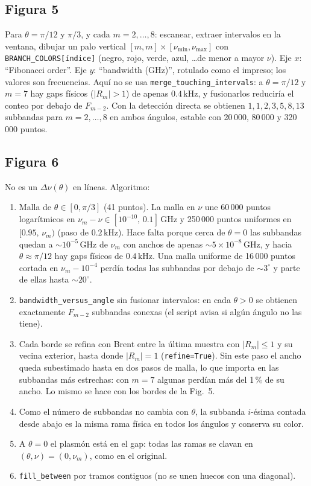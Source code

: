 \documentclass[11pt,a4paper]{article}
\begin{document}
\subsection{Figura 5}

Para \(\theta=\pi/12\) y \(\pi/3\), y cada \(m=2,\ldots,8\):
escanear, extraer intervalos en la ventana, dibujar un palo vertical
\([m,m]\times[\nu_{\min},\nu_{\max}]\) con
\texttt{BRANCH\_COLORS[índice]} (negro, rojo, verde, azul, \ldots de menor a
mayor \(\nu\)).
Eje \(x\): ``Fibonacci order''. Eje \(y\): ``bandwidth (GHz)'', rotulado como
el impreso; los valores son frecuencias.
Aquí no se usa \texttt{merge\_touching\_intervals}: a \(\theta=\pi/12\) y
\(m=7\) hay gaps físicos (\(|R_m|>1\)) de apenas \(0.4\,\mathrm{kHz}\), y
fusionarlos reduciría el conteo por debajo de \(F_{m-2}\).
Con la detección directa se obtienen \(1,1,2,3,5,8,13\) subbandas para
\(m=2,\ldots,8\) en ambos ángulos, estable con 20\,000, 80\,000 y 320\,000
puntos.

\subsection{Figura 6}

No es un \(\Delta\nu(\theta)\) en líneas. Algoritmo:

\begin{enumerate}
\item Malla de \(\theta\in[0,\pi/3]\) (41 puntos). La malla en \(\nu\) une
60\,000 puntos logarítmicos en \(\nu_m-\nu\in[10^{-10},\,0.1]\,\mathrm{GHz}\)
y 250\,000 puntos uniformes en \([0.95,\,\nu_m)\) (paso de
\(0.2\,\mathrm{kHz}\)).
Hace falta porque cerca de \(\theta=0\) las subbandas quedan a
\(\sim10^{-5}\,\mathrm{GHz}\) de \(\nu_m\) con anchos de apenas
\(\sim5\times10^{-8}\,\mathrm{GHz}\), y hacia \(\theta\approx\pi/12\) hay gaps físicos
de \(0.4\,\mathrm{kHz}\).
Una malla uniforme de 16\,000 puntos cortada en \(\nu_m-10^{-4}\) perdía todas
las subbandas por debajo de \(\sim3^\circ\) y parte de ellas hasta
\(\sim20^\circ\).
\item \texttt{bandwidth\_versus\_angle} sin fusionar intervalos: en cada
\(\theta>0\) se obtienen exactamente \(F_{m-2}\) subbandas conexas (el
script avisa si algún ángulo no las tiene).
\item Cada borde se refina con Brent entre la última muestra con
\(|R_m|\le1\) y su vecina exterior, hasta donde \(|R_m|=1\)
(\texttt{refine=True}). Sin este paso el ancho queda subestimado hasta en dos
pasos de malla, lo que importa en las subbandas más estrechas: con \(m=7\)
algunas perdían más del 1\,\% de su ancho. Lo mismo se hace con los bordes de
la Fig.~5.
\item Como el número de subbandas no cambia con \(\theta\), la subbanda
\(i\)-ésima contada desde abajo es la misma rama física en todos los ángulos
y conserva su color.
\item A \(\theta=0\) el plasmón está en el gap: todas las ramas se clavan en
\((\theta,\nu)=(0,\nu_m)\), como en el original.
\item \texttt{fill\_between} por tramos contiguos (no se unen huecos con una
diagonal).
\end{enumerate}
\end{document}
